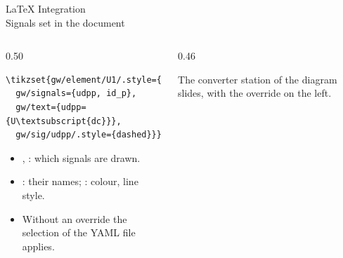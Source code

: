 \begin{frame}[fragile]{LaTeX Integration\\Signals set in the document}
  \begin{columns}[T,onlytextwidth]
    \begin{column}{0.50\textwidth}
      \vspace{0.4em}

      {\fontsize{6}{7.2}\selectfont
\begin{verbatim}
\tikzset{gw/element/U1/.style={
  gw/signals={udpp, id_p},
  gw/text={udpp={U\textsubscript{dc}}},
  gw/sig/udpp/.style={dashed}}}

\end{verbatim}}
      \begin{itemize}
        \setlength{\itemsep}{0.4em}
        \item {}, : which signals are drawn.
        \item {}: their names; : colour, line style.
        \item Without an override the selection of the YAML file applies.
      \end{itemize}
    \end{column}
    \begin{column}{0.46\textwidth}
      \centering
      \vspace{1.2em}
      {%
       }

      \vspace{0.4em}
      {\color{atGray}\scriptsize The converter station of the diagram slides, with the override on the left.}
    \end{column}
  \end{columns}
\end{frame}


